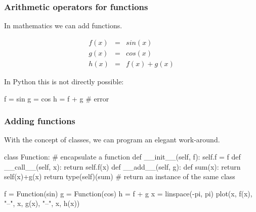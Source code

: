 \documentclass[hyperref={pdfpagelabels=false},table]{beamer}
\begin{document}
\begin{frame}[fragile]\frametitle{Arithmetic operators for functions}
In mathematics we can add functions.

 \begin{eqnarray*} 
   f(x) &=& sin(x) \\
   g(x) &=& cos(x) \\
   h(x) &=& f(x) + g(x)
 \end{eqnarray*}

\pause 

In Python this is not directly possible:

\begin{python}
f = sin
g = cos
h = f + g  # error 
\end{python}

\end{frame}

\begin{frame}[fragile]\frametitle{Adding functions}

With the concept of classes, we can program an elegant work-around.

\begin{python}
class Function: # encapsulate a function
    def __init__(self, f):
        self.f = f
    def __call__(self, x):
        return self.f(x)
    def __add__(self, g):
        def sum(x):
            return self(x)+g(x)
        return type(self)(sum) # return an instance of the same class

f = Function(sin)
g = Function(cos)
h = f + g
x = linspace(-pi, pi)
plot(x, f(x), "--", x, g(x), "--", x, h(x))
\end{python}

\end{frame}
\end{document}
